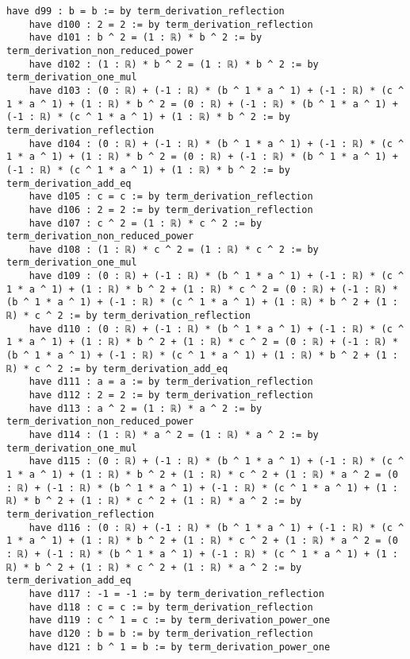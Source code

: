 \documentclass{article}
\begin{document}
\begin{tcolorbox}[colback=white!10, width=\linewidth]
\begin{lstlisting}[language=Lean4]
    have d99 : b = b := by term_derivation_reflection
    have d100 : 2 = 2 := by term_derivation_reflection
    have d101 : b ^ 2 = (1 : ℝ) * b ^ 2 := by term_derivation_non_reduced_power
    have d102 : (1 : ℝ) * b ^ 2 = (1 : ℝ) * b ^ 2 := by term_derivation_one_mul
    have d103 : (0 : ℝ) + (-1 : ℝ) * (b ^ 1 * a ^ 1) + (-1 : ℝ) * (c ^ 1 * a ^ 1) + (1 : ℝ) * b ^ 2 = (0 : ℝ) + (-1 : ℝ) * (b ^ 1 * a ^ 1) + (-1 : ℝ) * (c ^ 1 * a ^ 1) + (1 : ℝ) * b ^ 2 := by term_derivation_reflection
    have d104 : (0 : ℝ) + (-1 : ℝ) * (b ^ 1 * a ^ 1) + (-1 : ℝ) * (c ^ 1 * a ^ 1) + (1 : ℝ) * b ^ 2 = (0 : ℝ) + (-1 : ℝ) * (b ^ 1 * a ^ 1) + (-1 : ℝ) * (c ^ 1 * a ^ 1) + (1 : ℝ) * b ^ 2 := by term_derivation_add_eq
    have d105 : c = c := by term_derivation_reflection
    have d106 : 2 = 2 := by term_derivation_reflection
    have d107 : c ^ 2 = (1 : ℝ) * c ^ 2 := by term_derivation_non_reduced_power
    have d108 : (1 : ℝ) * c ^ 2 = (1 : ℝ) * c ^ 2 := by term_derivation_one_mul
    have d109 : (0 : ℝ) + (-1 : ℝ) * (b ^ 1 * a ^ 1) + (-1 : ℝ) * (c ^ 1 * a ^ 1) + (1 : ℝ) * b ^ 2 + (1 : ℝ) * c ^ 2 = (0 : ℝ) + (-1 : ℝ) * (b ^ 1 * a ^ 1) + (-1 : ℝ) * (c ^ 1 * a ^ 1) + (1 : ℝ) * b ^ 2 + (1 : ℝ) * c ^ 2 := by term_derivation_reflection
    have d110 : (0 : ℝ) + (-1 : ℝ) * (b ^ 1 * a ^ 1) + (-1 : ℝ) * (c ^ 1 * a ^ 1) + (1 : ℝ) * b ^ 2 + (1 : ℝ) * c ^ 2 = (0 : ℝ) + (-1 : ℝ) * (b ^ 1 * a ^ 1) + (-1 : ℝ) * (c ^ 1 * a ^ 1) + (1 : ℝ) * b ^ 2 + (1 : ℝ) * c ^ 2 := by term_derivation_add_eq
    have d111 : a = a := by term_derivation_reflection
    have d112 : 2 = 2 := by term_derivation_reflection
    have d113 : a ^ 2 = (1 : ℝ) * a ^ 2 := by term_derivation_non_reduced_power
    have d114 : (1 : ℝ) * a ^ 2 = (1 : ℝ) * a ^ 2 := by term_derivation_one_mul
    have d115 : (0 : ℝ) + (-1 : ℝ) * (b ^ 1 * a ^ 1) + (-1 : ℝ) * (c ^ 1 * a ^ 1) + (1 : ℝ) * b ^ 2 + (1 : ℝ) * c ^ 2 + (1 : ℝ) * a ^ 2 = (0 : ℝ) + (-1 : ℝ) * (b ^ 1 * a ^ 1) + (-1 : ℝ) * (c ^ 1 * a ^ 1) + (1 : ℝ) * b ^ 2 + (1 : ℝ) * c ^ 2 + (1 : ℝ) * a ^ 2 := by term_derivation_reflection
    have d116 : (0 : ℝ) + (-1 : ℝ) * (b ^ 1 * a ^ 1) + (-1 : ℝ) * (c ^ 1 * a ^ 1) + (1 : ℝ) * b ^ 2 + (1 : ℝ) * c ^ 2 + (1 : ℝ) * a ^ 2 = (0 : ℝ) + (-1 : ℝ) * (b ^ 1 * a ^ 1) + (-1 : ℝ) * (c ^ 1 * a ^ 1) + (1 : ℝ) * b ^ 2 + (1 : ℝ) * c ^ 2 + (1 : ℝ) * a ^ 2 := by term_derivation_add_eq
    have d117 : -1 = -1 := by term_derivation_reflection
    have d118 : c = c := by term_derivation_reflection
    have d119 : c ^ 1 = c := by term_derivation_power_one
    have d120 : b = b := by term_derivation_reflection
    have d121 : b ^ 1 = b := by term_derivation_power_one

\end{lstlisting}
\end{tcolorbox}
\end{document}
